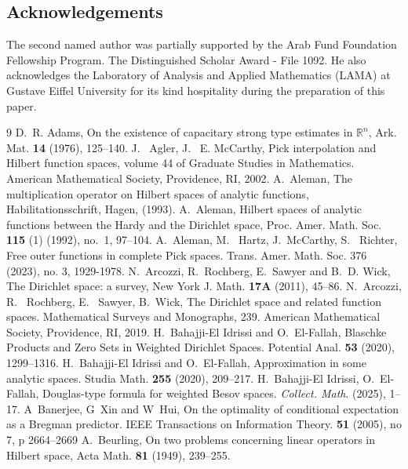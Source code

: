 \documentclass[12pt,reqno,a4paper]{amsart}
\newcommand\RR{\mathbb{R}}
\numberwithin{equation}{section}
\begin{document}
	\subsection*{Acknowledgements}
	The second named author was partially supported by the Arab Fund Foundation Fellowship Program. The Distinguished Scholar Award - File 1092. He also acknowledges the Laboratory of Analysis and Applied Mathematics (LAMA) at Gustave Eiffel University for its kind hospitality during the preparation of this paper.
	\begin{thebibliography}{9}
		D.~R. Adams,
		On the existence of capacitary strong type estimates in $\RR^n$,
		Ark. Mat. \textbf{14} (1976), 125--140.
		 J.~ Agler, J.~ E. McCarthy,
		Pick interpolation and Hilbert function spaces, 
		volume 44 of Graduate Studies in Mathematics. American 
		Mathematical Society, Providence, RI, 2002.
		A.~Aleman,
		The multiplication operator on Hilbert spaces of analytic functions,
		Habilitationsschrift, Hagen, (1993).
		A.~Aleman,
		Hilbert spaces of analytic functions between the Hardy and the Dirichlet space,
		Proc. Amer. Math. Soc. \textbf{115} (1) (1992), no.~1, 97--104.
		 A.~Aleman, M.~ Hartz, J.~McCarthy, S.~ Richter,  
		Free outer functions in complete Pick spaces. 
		Trans. Amer. Math. Soc. 376 (2023), no. 3, 1929-1978.
		N.~Arcozzi, R.~Rochberg, E.~Sawyer and B.~D. Wick,
		The Dirichlet space: a survey, New York J. Math.  \textbf{17A} (2011), 45--86.				
		N.~Arcozzi, R.~ Rochberg, E.~ Sawyer, B.~Wick,
		The Dirichlet space and related function spaces. Mathematical Surveys 	and Monographs, 239. American Mathematical 			Society, Providence, RI, 2019.
		H.~Bahajji-El Idrissi and O.~El-Fallah,
		Blaschke Products and Zero Sets in Weighted Dirichlet Spaces. 
		Potential Anal.  \textbf{53} (2020), 1299--1316.
		H.~Bahajji-El Idrissi and O.~El-Fallah, 
		Approximation in some analytic spaces. Studia Math. \textbf{255} (2020), 209--217.
		H.~Bahajji-El Idrissi, O.~El-Fallah, 
		Douglas-type formula for weighted Besov spaces. \emph{Collect. Math}. (2025), 1--17. %
		A~Banerjee,  G~Xin and W~Hui, 
		On the optimality of conditional expectation as a Bregman predictor. IEEE Transactions on Information Theory. \textbf{51} (2005), no 7, p 2664--2669
		A.~Beurling,
		On two problems concerning linear operators in Hilbert space, Acta Math. \textbf{81} (1949), 239--255.

\end{thebibliography}
\end{document}
